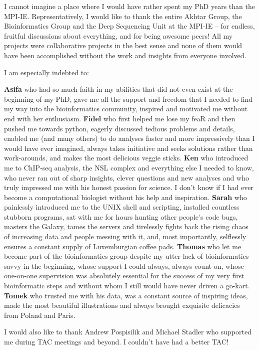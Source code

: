 I cannot imagine a place where I would have rather spent my PhD years than the MPI-IE. Representatively, I would like to thank the entire Akhtar Group, the Bioinformatics Group and the Deep Sequencing Unit at the MPI-IE -- for endless, fruitful discussions about everything, and for being awesome peers! All my projects were collaborative projects in the best sense and none of them would have been accomplished without the work and insights from everyone involved.

I am especially indebted to:

\textbf{Asifa} who had so much faith in my abilities that did not even exist at the beginning of my PhD, gave me all the support and freedom that I needed to find my way into the bioinformatics community, inspired and motivated me without end with her enthusiasm.
\textbf{Fidel} who first helped me lose my feaR and then pushed me towards python, eagerly discussed tedious problems and details, enabled me (and many others) to do analyses faster and more impressively than I would have ever imagined, always takes initiative and seeks solutions rather than work-arounds, and makes the most delicious veggie sticks.
\textbf{Ken} who introduced me to ChIP-seq analysis, the NSL complex and everything else I needed to know, who never ran out of sharp insights, clever questions and new analyses and who truly impressed me with his honest passion for science. I don't know if I had ever become a computational biologist without his help and inspiration.
\textbf{Sarah} who painlessly introduced me to the UNIX shell and scripting, installed countless stubborn programs, sat with me for hours hunting other people's code bugs, masters the Galaxy, tames the servers and tirelessly fights back the rising chaos of increasing data and people messing with it, and, most importantly, selflessly ensures a constant supply of Luxemburgian coffee pads.
\textbf{Thomas} who let me become part of the bioinformatics group despite my utter lack of bioinformatics savvy in the beginning, whose support I could always, always count on, whose one-on-one supervision was absolutely essential for the success of my very first bioinformatic steps and without whom I still would have never driven a go-kart.
\textbf{Tomek} who trusted me with his data, was a constant source of inspiring ideas, made the most beautiful illustrations and always brought exquisite delicacies from Poland and Paris.

I would also like to thank Andrew Pospisilik and Michael Stadler who supported me during TAC meetings and beyond. I couldn't have had a better TAC!